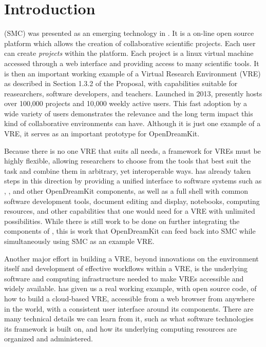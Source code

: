 \documentclass{deliverablereport}
\author{Erik Bray}
\begin{document}
\maketitle
%
\strut\githubissuedescription
\newpage\tableofcontents\newpage

\section{Introduction}

\SMC (SMC) was presented as an emerging technology in . It is a on-line open source platform which allows the creation of collaborative scientific projects. Each user can create \emph{projects} within the platform. Each project is a linux virtual machine accessed through a web interface and providing access to many scientific tools. It is then an important working example of a Virtual Research
Environment (VRE) as described in Section 1.3.2 of the Proposal,
with capabilities suitable for reasearchers, software developers, and teachers.
Launched in 2013, \SMC presently hosts over 100,000 projects and 10,000 weekly
active users. This fast adoption by a wide variety of users demonstrates the
relevance and the long term impact this kind of collaborative environments can
have.  Although it is just one example of a VRE, it serves as an important
prototype for OpenDreamKit.

Because there is no one VRE that suits all needs, a framework for VREs must be
highly flexible, allowing researchers to choose from the tools that best suit
the task and combine them in arbitrary, yet interoperable ways.  \SMC has
already taken steps in this direction by providing a unified interface to
software systems such as \Sage, \GAP, and other OpenDreamKit components, as
well as a full \Linux shell with common software development tools, \LATEX
document editing and display, \Jupyter notebooks, computing resources, and
other capabilities that one would need for a VRE with unlimited possibilities.
While there is still work to be done on further integrating the components of
\SMC, this is work that OpenDreamKit can feed back into SMC while
simultaneously using SMC as an example VRE.

Another major effort in building a VRE, beyond innovations on the environment
itself and development of effective workflows within a VRE, is the underlying
software and computing infrastructure needed to make VREs accessible and widely
available.  \SMC has given us a real working example, with open source code, of
how to build a cloud-based VRE, accessible from a web browser from anywhere in
the world, with a consistent user interface around its components.  There are
many technical details we can learn from it, such as what software technologies
its framework is built on, and how its underlying computing resources are
organized and administered.
\end{document}
